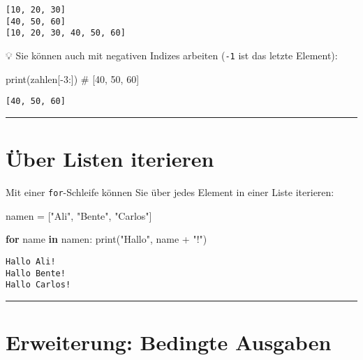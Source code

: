 \documentclass[
  letterpaper,
  DIV=11,
  numbers=noendperiod]{scrreprt}
\newenvironment{Shaded}{\begin{snugshade}}{\end{snugshade}}
\newcommand{\BuiltInTok}[1]{\textcolor[rgb]{0.00,0.23,0.31}{#1}}
\newcommand{\CommentTok}[1]{\textcolor[rgb]{0.37,0.37,0.37}{#1}}
\newcommand{\ControlFlowTok}[1]{\textcolor[rgb]{0.00,0.23,0.31}{\textbf{#1}}}
\newcommand{\DecValTok}[1]{\textcolor[rgb]{0.68,0.00,0.00}{#1}}
\newcommand{\KeywordTok}[1]{\textcolor[rgb]{0.00,0.23,0.31}{\textbf{#1}}}
\newcommand{\NormalTok}[1]{\textcolor[rgb]{0.00,0.23,0.31}{#1}}
\newcommand{\OperatorTok}[1]{\textcolor[rgb]{0.37,0.37,0.37}{#1}}
\newcommand{\StringTok}[1]{\textcolor[rgb]{0.13,0.47,0.30}{#1}}
\begin{document}
\begin{verbatim}
[10, 20, 30]
[40, 50, 60]
[10, 20, 30, 40, 50, 60]
\end{verbatim}

💡 Sie können auch mit negativen Indizes arbeiten (\texttt{-1} ist das
letzte Element):

\begin{Shaded}
\begin{Highlighting}[]
\BuiltInTok{print}\NormalTok{(zahlen[}\OperatorTok{{-}}\DecValTok{3}\NormalTok{:])  }\CommentTok{\# [40, 50, 60]}
\end{Highlighting}
\end{Shaded}

\begin{verbatim}
[40, 50, 60]
\end{verbatim}

\begin{center}\rule{0.5\linewidth}{0.5pt}\end{center}

\section{Über Listen iterieren}\label{uxfcber-listen-iterieren}

Mit einer \texttt{for}-Schleife können Sie über jedes Element in einer
Liste iterieren:

\begin{Shaded}
\begin{Highlighting}[]
\NormalTok{namen }\OperatorTok{=}\NormalTok{ [}\StringTok{"Ali"}\NormalTok{, }\StringTok{"Bente"}\NormalTok{, }\StringTok{"Carlos"}\NormalTok{]}

\ControlFlowTok{for}\NormalTok{ name }\KeywordTok{in}\NormalTok{ namen:}
    \BuiltInTok{print}\NormalTok{(}\StringTok{"Hallo"}\NormalTok{, name }\OperatorTok{+} \StringTok{"!"}\NormalTok{)}
\end{Highlighting}
\end{Shaded}

\begin{verbatim}
Hallo Ali!
Hallo Bente!
Hallo Carlos!
\end{verbatim}

\begin{center}\rule{0.5\linewidth}{0.5pt}\end{center}

\section{Erweiterung: Bedingte
Ausgaben}\label{erweiterung-bedingte-ausgaben}
\end{document}

